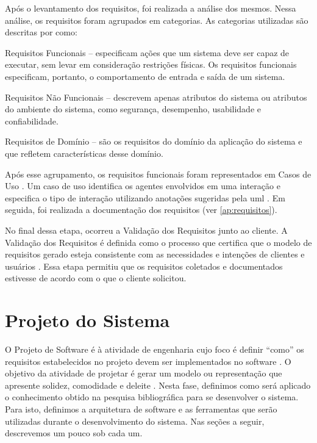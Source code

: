 Após o levantamento dos requisitos, foi realizada a análise dos mesmos. Nessa análise, os requisitos foram agrupados em categorias. As categorias utilizadas são descritas por 
 como:
\begin{alineascomponto}
    \item Requisitos Funcionais -- especificam ações que um sistema deve ser
capaz de executar, sem levar em consideração restrições físicas. Os requisitos
funcionais especificam, portanto, o comportamento de entrada e saída de um
sistema.
    \item Requisitos Não Funcionais -- descrevem apenas atributos do sistema ou
atributos do ambiente do sistema, como segurança, desempenho, usabilidade e
confiabilidade.
    \item Requisitos de Domínio -- são os requisitos do domínio da aplicação do sistema e que refletem características desse domínio.
\end{alineascomponto}

Após esse agrupamento, os requisitos funcionais foram representados em Casos de Uso \cite{jacobson92engenharia}. Um caso de uso identifica os agentes envolvidos em uma interação e especifica o tipo  de interação utilizando anotações sugeridas pela 
\gls{uml} . Em seguida, foi realizada a documentação dos requisitos (ver \autoref{ap:requisitos}).

No final dessa etapa, ocorreu a Validação dos Requisitos junto ao cliente.  A Validação dos Requisitos é definida como o processo que certifica que o modelo de requisitos gerado  esteja  consistente  
com  as  necessidades  e  intenções  de  clientes  e usuários \cite{rilston2003metodologia}. Essa etapa permitiu que os requisitos coletados e documentados estivesse de acordo com o que o 
cliente solicitou.

\section{Projeto do Sistema}

O Projeto de Software é à atividade de engenharia cujo foco é definir ``como'' os requisitos estabelecidos no projeto devem ser implementados no software \cite{pressman2006engenharia}. O objetivo da  
atividade de projetar é gerar um modelo ou representação que apresente solidez, comodidade e deleite \cite{pressman2006engenharia}. Nesta fase, definimos como será aplicado o conhecimento obtido na 
pesquisa bibliográfica para se desenvolver o sistema. Para isto, definimos a arquitetura de software e as ferramentas que serão utilizadas durante o desenvolvimento do sistema. Nas seções a seguir, 
descrevemos um pouco sob cada um.

